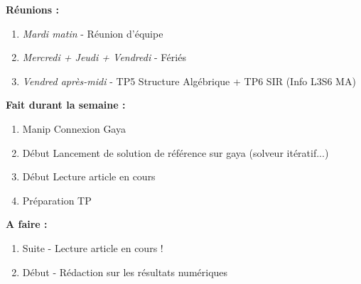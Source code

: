 \textbf{Réunions :}
\begin{enumerate}[label=\textbullet]
	\item \textit{Mardi matin} - Réunion d'équipe
	\item \textit{Mercredi + Jeudi + Vendredi} - Fériés
	\item \textit{Vendred après-midi} - TP5 Structure Algébrique + TP6 SIR (Info L3S6 MA)
\end{enumerate}
\textbf{Fait durant la semaine :}
\begin{enumerate}[label=\textbullet]
	\item Manip Connexion Gaya
	\item Début Lancement de solution de référence sur gaya (solveur itératif...)
	\item Début Lecture article en cours
	\item Préparation TP
\end{enumerate}
\textbf{A faire :}
\begin{enumerate}[label=\textbullet]
	\item Suite - Lecture article en cours !
	\item Début - Rédaction sur les résultats numériques
\end{enumerate}
